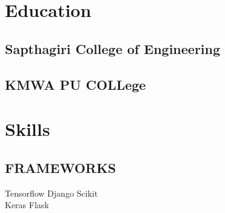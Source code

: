 \documentclass[]{deedy-resume-reversed}
\begin{document}
\begin{minipage}[t]{0.59\textwidth}

% 
% 

%
%

\end{minipage}
\hfill
\begin{minipage}[t]{0.30\textwidth}


\section{Education}

\subsection{Sapthagiri College of Engineering}
\sectionsep

\subsection{KMWA PU COLLege}
\sectionsep


\section{Skills}
\subsection{FRAMEWORKS}
\large{Tensorflow \textbullet{} Django \textbullet{} Scikit  \\
\textbullet{} Keras \textbullet{} Flask}

\end{minipage}
\end{document}
